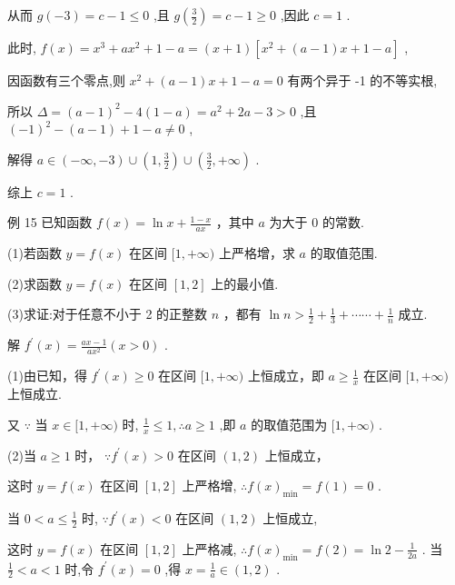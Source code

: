 \documentclass[10pt]{article}
\begin{document}
从而 \(g\left( {-3}\right)  = c - 1 \leq  0\) ,且 \(g\left( \frac{3}{2}\right)  = c - 1 \geq  0\) ,因此 \(c = 1\) .

此时, \(f\left( x\right)  = {x}^{3} + a{x}^{2} + 1 - a = \left( {x + 1}\right) \left\lbrack  {{x}^{2} + \left( {a - 1}\right) x + 1 - a}\right\rbrack\) ,

因函数有三个零点,则 \({x}^{2} + \left( {a - 1}\right) x + 1 - a = 0\) 有两个异于 -1 的不等实根,

所以 \(\Delta  = {\left( a - 1\right) }^{2} - 4\left( {1 - a}\right)  = {a}^{2} + {2a} - 3 > 0\) ,且 \({\left( -1\right) }^{2} - \left( {a - 1}\right)  + 1 - a \neq  0\) ,

解得 \(a \in  \left( {-\infty , - 3}\right)  \cup  \left( {1,\frac{3}{2}}\right)  \cup  \left( {\frac{3}{2}, + \infty }\right)\) .

综上 \(c = 1\) .

例 15 已知函数 \(f\left( x\right)  = \ln x + \frac{1 - x}{ax}\) ，其中 \(a\) 为大于 0 的常数.

(1)若函数 \(y = f\left( x\right)\) 在区间 \(\lbrack 1, + \infty )\) 上严格增，求 \(a\) 的取值范围.

(2)求函数 \(y = f\left( x\right)\) 在区间 \(\left\lbrack  {1,2}\right\rbrack\) 上的最小值.

(3)求证:对于任意不小于 2 的正整数 \(n\) ，都有 \(\ln n > \frac{1}{2} + \frac{1}{3} + \cdots \cdots  + \frac{1}{n}\) 成立.

解 \({f}^{\prime }\left( x\right)  = \frac{{ax} - 1}{a{x}^{2}}\left( {x > 0}\right)\) .

(1)由已知，得 \({f}^{\prime }\left( x\right)  \geq  0\) 在区间 \(\lbrack 1, + \infty )\) 上恒成立，即 \(a \geq  \frac{1}{x}\) 在区间 \(\lbrack 1, + \infty )\) 上恒成立.

又 \(\because\) 当 \(x \in  \lbrack 1, + \infty )\) 时, \(\frac{1}{x} \leq  1,\therefore a \geq  1\) ,即 \(a\) 的取值范围为 \(\lbrack 1, + \infty )\) .

(2)当 \(a \geq  1\) 时， \(\because {f}^{\prime }\left( x\right)  > 0\) 在区间 \(\left( {1,2}\right)\) 上恒成立，

这时 \(y = f\left( x\right)\) 在区间 \(\left\lbrack  {1,2}\right\rbrack\) 上严格增, \(\therefore f{\left( x\right) }_{\min } = f\left( 1\right)  = 0\) .

当 \(0 < a \leq  \frac{1}{2}\) 时, \(\because {f}^{\prime }\left( x\right)  < 0\) 在区间 \(\left( {1,2}\right)\) 上恒成立,

这时 \(y = f\left( x\right)\) 在区间 \(\left\lbrack  {1,2}\right\rbrack\) 上严格减, \(\therefore f{\left( x\right) }_{\min } = f\left( 2\right)  = \ln 2 - \frac{1}{2a}\) . 当 \(\frac{1}{2} < a < 1\) 时,令 \({f}^{\prime }\left( x\right)  = 0\) ,得 \(x = \frac{1}{a} \in  \left( {1,2}\right)\) .
\end{document}
